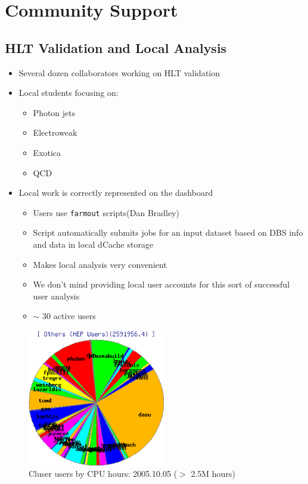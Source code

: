 \documentclass{beamer}
\newcommand{\ca}{\ensuremath{\sim}}
\begin{document}
\section{Community Support}
\subsection{HLT Validation and Local Analysis}
\begin{frame}
\begin{itemize}
    \item Several dozen collaborators working on HLT validation
    \item Local students focusing on:
    \begin{itemize}
        \item Photon jets
        \item Electroweak
        \item Exotica
        \item QCD
    \end{itemize}
    \item Local work is correctly represented on the dashboard
    \begin{itemize}
        \item Users use {\tt farmout} scripts\footnotemark[1] (Dan Bradley)
        \item Script automatically submits jobs for an input dataset based on DBS info and data in local dCache storage
        \item Makes local analysis very convenient
        \item We don't mind providing local user accounts for this sort of successful user analysis
        \item \ca{} 30 active users
    \end{itemize}
\end{itemize}
\end{frame}

\begin{frame}
\begin{figure}
    \includegraphics[height=6cm]{Graphics/glow-userpie.png}
    \caption{Cluser users by CPU hours: 2005.10.05 ($>$ 2.5M hours)}
\end{figure}
\end{frame}
\end{document}
